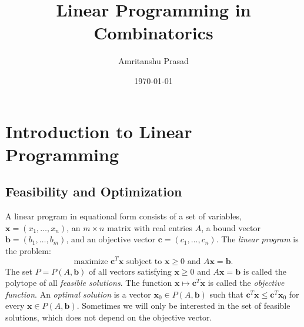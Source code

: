 \documentclass{amsbook}
\newcommand{\xx}{\mathbf x}
\newcommand{\cc}{\mathbf c}
\newcommand{\bb}{\mathbf b}
\theoremstyle{definition}
\theoremstyle{remark}
\begin{document}
\title{Linear Programming in Combinatorics}
\author{Amritanshu Prasad}
\address{The Institute of Mathematical Sciences, Chennai.}
\address{Homi Bhabha National Institute, Mumbai.}
\date{\today}
\maketitle
\chapter{Introduction to Linear Programming}
\label{cha:intro-lp}
\section{Feasibility and Optimization}
\label{sec:feas-opt}
A linear program in equational form consists of a set of variables, $\xx=(x_1,\dotsc,x_n)$, an $m\times n$ matrix with real entries $A$, a bound vector $\bb=(b_1,\dotsc,b_m)$, and an objective vector $\cc = (c_1,\dotsc,c_n)$.
The \emph{linear program} is the problem:
\begin{equation}
  \tag{LP}
  \label{eq:lp-problem}
  \text{maximize $\cc^T\xx$ subject to $\xx\geq 0$ and $A\xx=\bb$}.
\end{equation}
The set $P=P(A,\bb)$ of all vectors satisfying $\xx\geq 0$ and $A\xx=\bb$ is called the polytope of all \emph{feasible solutions}.
The function $\xx\mapsto \cc^T\xx$ is called the \emph{objective function}.
An \emph{optimal solution} is a vector $\xx_0\in P(A,\bb)$ such that $\cc^T\xx\leq \cc^T\xx_0$ for every $\xx\in P(A,\bb)$.
Sometimes we will only be interested in the set of feasible solutions, which does not depend on the objective vector.
\end{document}
